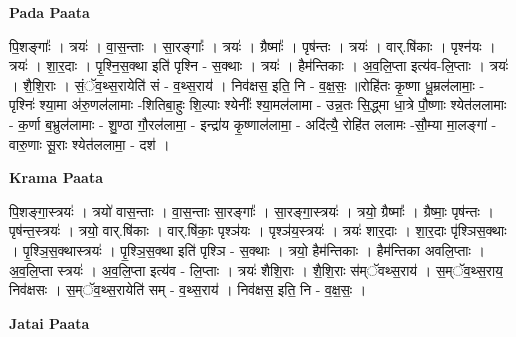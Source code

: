 \documentclass[17pt]{extarticle}
\begin{document}
\textbf{Pada Paata} \newline

पि॒शङ्गाः᳚ । त्रयः॑ । वा॒स॒न्ताः । सा॒रङ्गाः᳚ । त्रयः॑ । ग्रैष्माः᳚ । पृष॑न्तः । त्रयः॑ । वार्.षि॑काः । पृश्न॑यः । त्रयः॑ । शा॒र॒दाः । पृ॒श्नि॒स॒क्था इति॑ पृश्नि - स॒क्थाः । त्रयः॑ । हैम॑न्तिकाः । अ॒व॒लि॒प्ता इत्य॑व-लि॒प्ताः । त्रयः॑ । शै॒शि॒राः । सं॒ॅव॒थ्स॒रायेति॑ सं - व॒थ्स॒राय॑ । निव॑क्षस॒ इति॒ नि - व॒क्ष॒सः॒ ॥रोहि॑तः कृ॒ष्णा धू॒म्रल॑लामाः॒ - पृश्निः॑ श्या॒मा अ॑रु॒णल॑लामाः -शितिबा॒हुः शि॒ल्पाः श्येनीः᳚ श्या॒मल॑लामा - उन्न॒तः सि॒द्ध्मा धा॒त्रे पौ॒ष्णाः श्येत॑ललामाः - क॒र्णा ब॒भ्रुल॑लामाः - शु॒ण्ठा गौ॒रल॑लामा॒ - इन्द्रा॑य कृ॒ष्णाल॑लामा॒ - अदि॑त्यै॒ रोहि॑त ललामः -सौ॒म्या मा॒लङ्गा॑ - वारु॒णाः सू॒राः श्येत॑ललामा॒ - दश॑ ।  \newline


\textbf{Krama Paata} \newline

पि॒शङ्गा॒स्त्रयः॑ । त्रयो॑ वास॒न्ताः । वा॒स॒न्ताः सा॒रङ्गाः᳚ । सा॒रङ्गा॒स्त्रयः॑ । त्रयो॒ ग्रैष्माः᳚ । ग्रैष्माः॒ पृष॑न्तः । पृष॑न्त॒स्त्रयः॑ । त्रयो॒ वार्.षि॑काः । वार्.षि॑काः॒ पृश्ञ॑यः । पृश्ञ॑य॒स्त्रयः॑ । त्रयः॑ शार॒दाः । शा॒र॒दाः पृ॑श्ञिस॒क्थाः । पृ॒श्ञि॒स॒क्थास्त्रयः॑ । पृ॒श्ञि॒स॒क्था इति॑ पृश्ञि - स॒क्थाः । त्रयो॒ हैम॑न्तिकाः । हैम॑न्तिका अवलि॒प्ताः । अ॒व॒लि॒प्ता स्त्रयः॑ । अ॒व॒लि॒प्ता इत्य॑व - लि॒प्ताः । त्रयः॑ शैशि॒राः । शै॒शि॒राः स॑म्ॅवथ्स॒राय॑ । स॒म्ॅव॒थ्स॒राय॒ निव॑क्षसः । स॒म्ॅव॒थ्स॒रायेति॑ सम् - व॒थ्स॒राय॑ । निव॑क्षस॒ इति॒ नि - व॒क्ष॒सः॒ । \newline

\textbf{Jatai Paata} \newline
\end{document}
